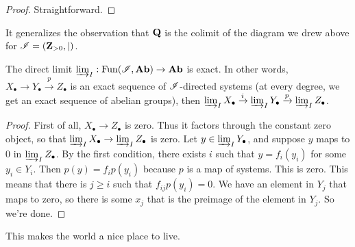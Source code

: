 \begin{proof}
Straightforward.
\end{proof}
It generalizes the observation that $\mathbf Q$ is the colimit of the diagram we drew above for $\mathscr I=(\mathbf Z_{>0},|)$.
\begin{corollary}
The direct limit $\varinjlim_I:\operatorname{Fun}(\mathscr I,\mathbf{Ab})\to\mathbf{Ab}$ is exact. In other words, $X_\bullet\to Y_\bullet\xrightarrow{p} Z_\bullet$ is an exact sequence of $\mathscr I$-directed systems (at every degree, we get an exact sequence of abelian groups), then $\varinjlim_IX_\bullet\xrightarrow{i} \varinjlim_IY_\bullet\xrightarrow{p} \varinjlim_IZ_\bullet$.
\end{corollary}
\begin{proof}
First of all, $X_\bullet\to Z_\bullet$ is zero. Thus it factors through the constant zero object, so that $\varinjlim_IX_\bullet\to \varinjlim_I Z_\bullet$ is zero. Let $y\in \varinjlim_IY_\bullet$, and suppose $y$ maps to $0$ in $\varinjlim_IZ_\bullet$. By the first condition, there exists $i$ such that $y=f_i(y_i)$ for some $y_i\in Y_i$. Then $p(y)=f_ip(y_i)$ because $p$ is a map of systems. This is zero. This means that there is $j\geq i$ such that $f_{ij}p(y_i)=0$. We have an element in $Y_j$ that maps to zero, so there is some $x_j$ that is the preimage of the element in $Y_j$. So we're done.
\end{proof}
This makes the world a nice place to live.

